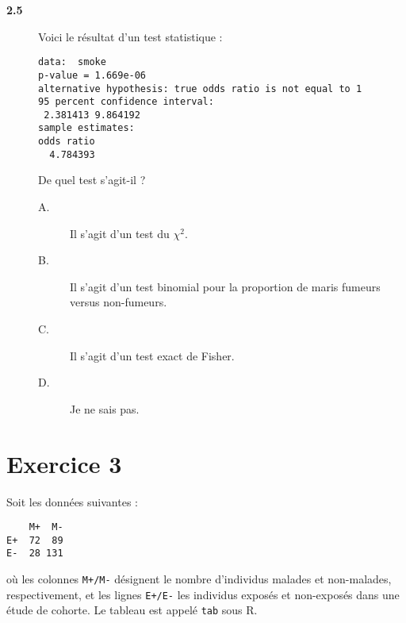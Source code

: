 \documentclass[11pt]{report}
\theoremstyle{definition}
\begin{document}
\begin{description}
\item[\bf 2.5]  Voici le résultat d'un test
  statistique :
\begin{Verbatim}[frame=single]
data:  smoke 
p-value = 1.669e-06
alternative hypothesis: true odds ratio is not equal to 1 
95 percent confidence interval:
 2.381413 9.864192 
sample estimates:
odds ratio 
  4.784393
\end{Verbatim}
De quel test s'agit-il ?
\begin{description}
\item[A.] Il s'agit d'un test du $\chi^2$.
\item[B.] Il s'agit d'un test binomial pour la proportion de maris fumeurs
  versus non-fumeurs.
\item[C.] Il s'agit d'un test exact de Fisher.
\item[D.] Je ne sais pas.
\end{description}  
\end{description}

\section*{Exercice 3}
Soit les données suivantes :
\begin{verbatim}
    M+  M-
E+  72  89
E-  28 131
\end{verbatim}
où les colonnes \texttt{M+/M-} désignent le nombre d'individus malades et
non-malades, respectivement, et les lignes \texttt{E+/E-} les individus
exposés et non-exposés dans une étude de cohorte. Le tableau est appelé
\texttt{tab} sous R.
\end{document}
